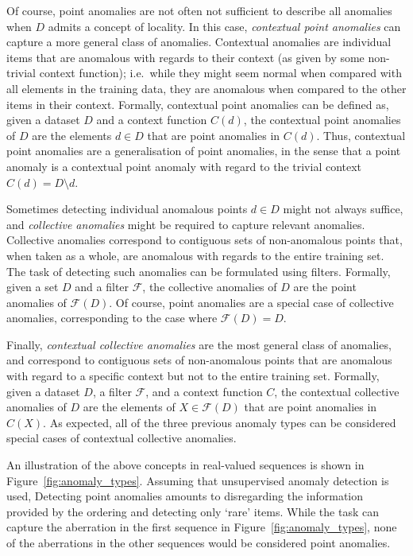Of course, point anomalies are not often not sufficient to describe all anomalies when $D$ admits a concept of locality. In this case, \emph{contextual point anomalies} can capture a more general class of anomalies. Contextual anomalies are individual items that are anomalous with regards to their context (as given by some non-trivial context function); i.e.\ while they might seem normal when compared with all elements in the training data, they are anomalous when compared to the other items in their context. Formally, contextual point anomalies can be defined as, given a dataset $D$ and a context function $C(d)$, the contextual point anomalies of $D$ are the elements $d \in D$ that are point anomalies in $C(d)$. Thus, contextual point anomalies are a generalisation of point anomalies, in the sense that a point anomaly is a contextual point anomaly with regard to the trivial context $C(d) = D \setminus {d}$.

Sometimes detecting individual anomalous points $d \in D$ might not always suffice, and \emph{collective anomalies} might be required to capture relevant anomalies. Collective anomalies correspond to contiguous sets of non-anomalous points that, when taken as a whole, are anomalous with regards to the entire training set. The task of detecting such anomalies can be formulated using filters. Formally, given a set $D$ and a filter $\mathcal{F}$, the collective anomalies of $D$ are the point anomalies of $\mathcal{F}(D)$. Of course, point anomalies are a special case of collective anomalies, corresponding to the case where $\mathcal{F}(D) = D$.

Finally, \emph{contextual collective anomalies} are the most general class of anomalies, and correspond to contiguous sets of non-anomalous points that are anomalous with regard to a specific context but not to the entire training set. Formally, given a dataset $D$, a filter $\mathcal{F}$, and a context function $C$, the contextual collective anomalies of $D$ are the elements of $X \in \mathcal{F}(D)$ that are point anomalies in $C(X)$. As expected, all of the three previous anomaly types can be considered special cases of contextual collective anomalies.

An illustration of the above concepts in real-valued sequences is shown in Figure~\ref{fig:anomaly_types}. Assuming that unsupervised anomaly detection is used, Detecting point anomalies amounts to disregarding the information provided by the ordering and detecting only `rare' items. While the task can capture the aberration in the first sequence in Figure~\ref{fig:anomaly_types}, none of the aberrations in the other sequences would be considered point anomalies.

